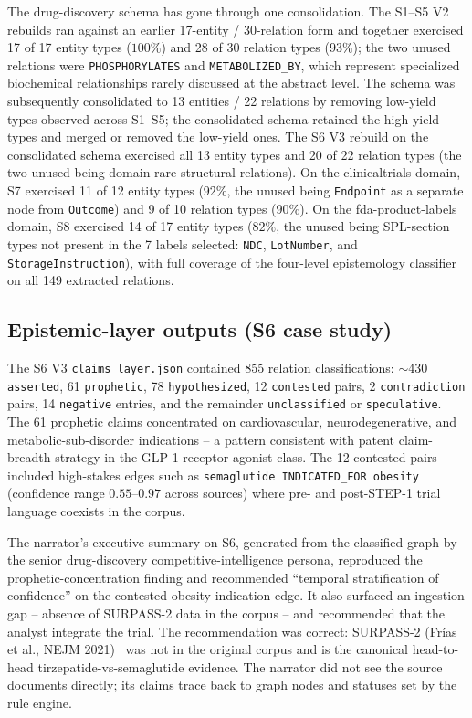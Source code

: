 The drug-discovery schema has gone through one consolidation. The S1--S5 V2 rebuilds ran against an earlier 17-entity / 30-relation form and together exercised 17 of 17 entity types ($100\%$) and 28 of 30 relation types ($93\%$); the two unused relations were \texttt{PHOSPHORYLATES} and \texttt{METABOLIZED\_BY}, which represent specialized biochemical relationships rarely discussed at the abstract level. The schema was subsequently consolidated to 13 entities / 22 relations by removing low-yield types observed across S1--S5; the consolidated schema retained the high-yield types and merged or removed the low-yield ones. The S6 V3 rebuild on the consolidated schema exercised all 13 entity types and 20 of 22 relation types (the two unused being domain-rare structural relations). On the clinicaltrials domain, S7 exercised 11 of 12 entity types ($92\%$, the unused being \texttt{Endpoint} as a separate node from \texttt{Outcome}) and 9 of 10 relation types ($90\%$). On the fda-product-labels domain, S8 exercised 14 of 17 entity types ($82\%$, the unused being SPL-section types not present in the 7 labels selected: \texttt{NDC}, \texttt{LotNumber}, and \texttt{StorageInstruction}), with full coverage of the four-level epistemology classifier on all 149 extracted relations.

\subsection{Epistemic-layer outputs (S6 case study)}

The S6 V3 \texttt{claims\_layer.json} contained 855 relation classifications: $\sim$430 \texttt{asserted}, 61 \texttt{prophetic}, 78 \texttt{hypothesized}, 12 \texttt{contested} pairs, 2 \texttt{contradiction} pairs, 14 \texttt{negative} entries, and the remainder \texttt{unclassified} or \texttt{speculative}. The 61 prophetic claims concentrated on cardiovascular, neurodegenerative, and metabolic-sub-disorder indications -- a pattern consistent with patent claim-breadth strategy in the GLP-1 receptor agonist class. The 12 contested pairs included high-stakes edges such as \texttt{semaglutide INDICATED\_FOR obesity} (confidence range $0.55$--$0.97$ across sources) where pre- and post-STEP-1 trial language coexists in the corpus.

The narrator's executive summary on S6, generated from the classified graph by the senior drug-discovery competitive-intelligence persona, reproduced the prophetic-concentration finding and recommended ``temporal stratification of confidence'' on the contested obesity-indication edge. It also surfaced an ingestion gap -- absence of SURPASS-2 data in the corpus -- and recommended that the analyst integrate the trial. The recommendation was correct: SURPASS-2 (Frías et al., NEJM 2021)~\cite{frias2021surpass2} was not in the original corpus and is the canonical head-to-head tirzepatide-vs-semaglutide evidence. The narrator did not see the source documents directly; its claims trace back to graph nodes and statuses set by the rule engine.

